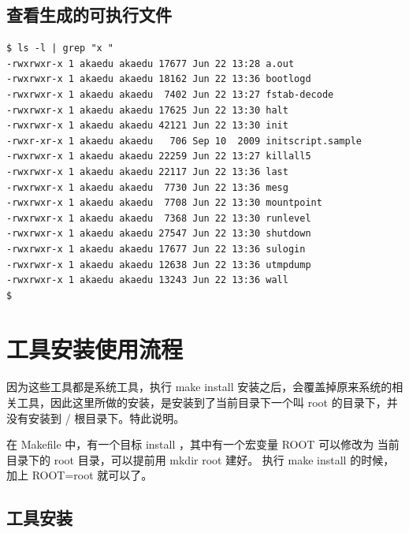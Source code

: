 \subsection{查看生成的可执行文件}

{\begin{shaded}\begin{verbatim}
$ ls -l | grep "x "
-rwxrwxr-x 1 akaedu akaedu 17677 Jun 22 13:28 a.out
-rwxrwxr-x 1 akaedu akaedu 18162 Jun 22 13:36 bootlogd
-rwxrwxr-x 1 akaedu akaedu  7402 Jun 22 13:27 fstab-decode
-rwxrwxr-x 1 akaedu akaedu 17625 Jun 22 13:30 halt
-rwxrwxr-x 1 akaedu akaedu 42121 Jun 22 13:30 init
-rwxr-xr-x 1 akaedu akaedu   706 Sep 10  2009 initscript.sample
-rwxrwxr-x 1 akaedu akaedu 22259 Jun 22 13:27 killall5
-rwxrwxr-x 1 akaedu akaedu 22117 Jun 22 13:36 last
-rwxrwxr-x 1 akaedu akaedu  7730 Jun 22 13:36 mesg
-rwxrwxr-x 1 akaedu akaedu  7708 Jun 22 13:30 mountpoint
-rwxrwxr-x 1 akaedu akaedu  7368 Jun 22 13:30 runlevel
-rwxrwxr-x 1 akaedu akaedu 27547 Jun 22 13:30 shutdown
-rwxrwxr-x 1 akaedu akaedu 17677 Jun 22 13:36 sulogin
-rwxrwxr-x 1 akaedu akaedu 12638 Jun 22 13:36 utmpdump
-rwxrwxr-x 1 akaedu akaedu 13243 Jun 22 13:36 wall
$ 
\end{verbatim}\end{shaded}}
\section{工具安装使用流程}

因为这些工具都是系统工具，执行 make install
安装之后，会覆盖掉原来系统的相关工具，因此这里所做的安装，是安装到了当前目录下一个叫
root 的目录下，并没有安装到 / 根目录下。特此说明。

在 Makefile 中，有一个目标 install ，其中有一个宏变量 ROOT 可以修改为
当前目录下的 root 目录，可以提前用 mkdir root 建好。 执行 make install
的时候，加上 ROOT=root 就可以了。

\subsection{工具安装}

